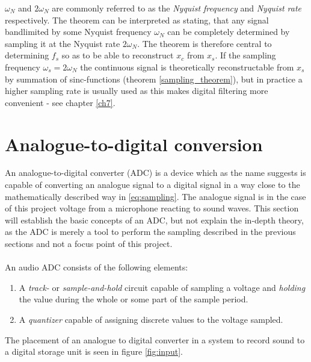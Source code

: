 $\omega_N$ and $2\omega_N$ are commonly referred to as the \textit{Nyquist frequency} and \textit{Nyquist rate} respectively. The theorem can be interpreted as stating, that any signal bandlimited by some Nyquist frequency $\omega_N$ can be completely determined by sampling it at the Nyquist rate $2\omega_N$. The theorem is therefore central to determining $f_s$ so as to be able to reconstruct $x_c$ from $x_s$. If the sampling frequency $\omega_s=2\omega_N$ the continuous signal is theoretically reconstructable from $x_s$ by summation of sinc-functions (theorem \ref{sampling_theorem}), but in practice a higher sampling rate is usually used as this makes digital filtering more convenient - see chapter \ref{ch7}.
\section{Analogue-to-digital conversion}\label{ADC}
An analogue-to-digital converter (ADC) is a device which as the name suggests is capable of converting an analogue signal to a digital signal in a way close to the mathematically described way in \ref{eq:sampling}. The analogue signal is in the case of this project voltage from a microphone reacting to sound waves. This section will establish the basic concepts of an ADC, but not explain the in-depth theory, as the ADC is merely a tool to perform the sampling described in the previous sections and not a focus point of this project.
\\\\
An audio ADC consists of the following elements:
\begin{enumerate}
\item A \textit{track-} or \textit{sample-and-hold} circuit capable of sampling a voltage and \textit{holding} the value during the whole or some part of the sample period.
\item A \textit{quantizer} capable of assigning discrete values to the voltage sampled.
\end{enumerate}
The placement of an analogue to digital converter in a system to record sound to a digital storage unit is seen in figure \ref{fig:input}.
